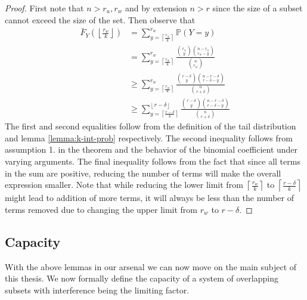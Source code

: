     \begin{proof}  
        First note that $n > r_u, r_w$ and by extension $n > r$ since the size of a subset cannot exceed the size of the set.  
        Then observe that 
        \begin{equation}
            \begin{split}
                \bar{F}_Y\left(\left\lfloor \frac{r_w}{k} \right\rfloor\right)  
                &=
                 \sum_{y = \left\lceil \frac{r_w}{k} \right\rceil}^{r_w} \mathbb{P}(Y=y)  
                \\[2em] &=    \sum_{y = \left\lceil \frac{r_w}{k} \right\rceil}^{r_w} \frac{\binom{r_u}{y} \binom{n-r_u}{r_w-y}}{\binom{n}{r_w}} 
                \\[2em] &\ge  \sum_{y = \left\lceil \frac{r_w}{k} \right\rceil}^{r_w} \frac{\binom{r-\delta}{y} \binom{n-r-\delta}{r-\delta-y}}{\binom{n}{r+\delta}}  
                \\[2em] &\ge  \sum_{y = \left\lceil \frac{r-\delta}{k} \right\rceil}^{\left\lfloor r - \delta \right\rfloor} \frac{\binom{r-\delta}{y} \binom{n-r-\delta}{r-\delta-y}}{\binom{n}{r+\delta}}  
            \end{split}
        \end{equation}
        The first and second equalities follow from the definition of the tail distribution and lemma \ref{lemma:k-int-prob} respectively. The second inequality follows from assumption 1. in the theorem and the behavior of the binomial coefficient under varying arguments. The final inequality follows from the fact that since all terms in the sum are positive, reducing the number of terms will make the overall expression smaller. Note that while reducing the lower limit from $\left\lceil \frac{r_w}{k} \right\rceil$ to $\left\lceil \frac{r-\delta}{k} \right\rceil$ might lead to addition of more terms, it will always be less than the number of terms removed due to changing the upper limit from $r_w$ to $r-\delta$.
        
    \end{proof}

    \subsection{Capacity}
    With the above lemmas in our arsenal we can now move on  the main subject of this thesis. We now formally define the capacity of a system of overlapping subsets with interference being the limiting factor. 

